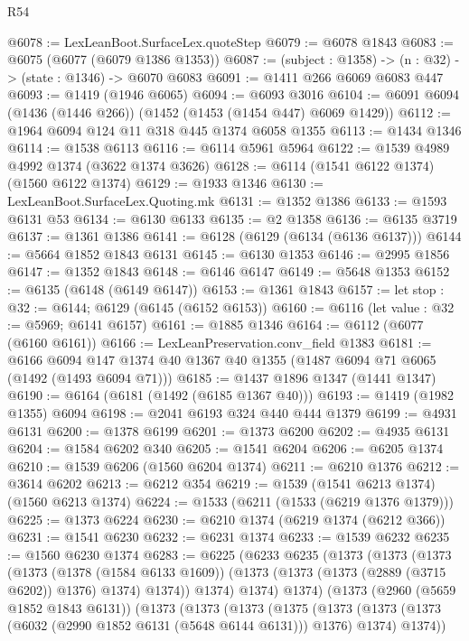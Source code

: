 \begin{lexlean}{R54}
\begin{coremodule}
@6078 := LexLeanBoot.SurfaceLex.quoteStep
@6079 := @6078 @1843
@6083 := @6075 (@6077 (@6079 @1386 @1353))
@6087 := (subject : @1358) -> (n : @32) -> (state : @1346) -> @6070 @6083
@6091 := @1411 @266 @6069 @6083 @447
@6093 := @1419 (@1946 @6065)
@6094 := @6093 @3016
@6104 := @6091 @6094 (@1436 (@1446 @266)) (@1452 (@1453 (@1454 @447) @6069 @1429))
@6112 := @1964 @6094 @124 @11 @318 @445 @1374 @6058 @1355
@6113 := @1434 @1346
@6114 := @1538 @6113
@6116 := @6114 @5961 @5964
@6122 := @1539 @4989 @4992 @1374 (@3622 @1374 @3626)
@6128 := @6114 (@1541 @6122 @1374) (@1560 @6122 @1374)
@6129 := @1933 @1346
@6130 := LexLeanBoot.SurfaceLex.Quoting.mk
@6131 := @1352 @1386
@6133 := @1593 @6131 @53
@6134 := @6130 @6133
@6135 := @2 @1358
@6136 := @6135 @3719
@6137 := @1361 @1386
@6141 := @6128 (@6129 (@6134 (@6136 @6137)))
@6144 := @5664 @1852 @1843 @6131
@6145 := @6130 @1353
@6146 := @2995 @1856
@6147 := @1352 @1843
@6148 := @6146 @6147
@6149 := @5648 @1353
@6152 := @6135 (@6148 (@6149 @6147))
@6153 := @1361 @1843
@6157 := let stop : @32 := @6144; @6129 (@6145 (@6152 @6153))
@6160 := @6116 (let value : @32 := @5969; @6141 @6157)
@6161 := @1885 @1346
@6164 := @6112 (@6077 (@6160 @6161))
@6166 := LexLeanPreservation.conv_field @1383
@6181 := @6166
    @6094
    @147
    @1374
    @40
    @1367
    @40
    @1355
    (@1487 @6094 @71 @6065 (@1492 (@1493 @6094 @71)))
@6185 := @1437 @1896 @1347 (@1441 @1347)
@6190 := @6164 (@6181 (@1492 (@6185 @1367 @40)))
@6193 := @1419 (@1982 @1355) @6094
@6198 := @2041 @6193 @324 @440 @444 @1379
@6199 := @4931 @6131
@6200 := @1378 @6199
@6201 := @1373 @6200
@6202 := @4935 @6131
@6204 := @1584 @6202 @340
@6205 := @1541 @6204
@6206 := @6205 @1374
@6210 := @1539 @6206 (@1560 @6204 @1374)
@6211 := @6210 @1376
@6212 := @3614 @6202
@6213 := @6212 @354
@6219 := @1539 (@1541 @6213 @1374) (@1560 @6213 @1374)
@6224 := @1533 (@6211 (@1533 (@6219 @1376 @1379)))
@6225 := @1373 @6224
@6230 := @6210 @1374 (@6219 @1374 (@6212 @366))
@6231 := @1541 @6230
@6232 := @6231 @1374
@6233 := @1539 @6232
@6235 := @1560 @6230 @1374
@6283 := @6225
    (@6233
      @6235
      (@1373
        (@1373
          (@1373
            (@1373
              (@1378 (@1584 @6133 @1609))
              (@1373 (@1373 (@1373 (@2889 (@3715 @6202)) @1376) @1374) @1374))
            @1374)
          @1374)
        @1374)
      (@1373
        (@2960 (@5659 @1852 @1843 @6131))
        (@1373
          (@1373
            (@1373
              (@1375
                (@1373
                  (@1373 (@1373 (@6032 (@2990 @1852 @6131 (@5648 @6144 @6131))) @1376) @1374)
                  @1374))

\end{coremodule}
\end{lexlean}

